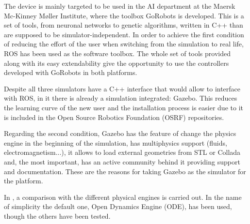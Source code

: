The device is mainly targeted to be used in the AI department at the Maersk Mc-Kinney Møller Institute, where the toolbox GoRobots is developed.
This is a set of tools, from neuronal networks to genetic algorithms, written in C++ than are supposed to be simulator-independent.
In order to achieve the first condition of reducing the effort of the user when switching from the simulation to real life, ROS \cite{ros} has been used as the software toolbox.
The whole set of tools provided along with its easy extendability give the opportunity to use the controllers developed with GoRobots in both platforms.

Despite all three simulators have a C++ interface that would allow to interface with ROS, in it there is already a simulation integrated: Gazebo.
This reduces the learning curve of the new user and the installation process is easier due to it is included in the Open Source Robotics Foundation (OSRF) repositories.

Regarding the second condition, Gazebo has the feature of change the physics engine in the beginning of the simulation, has multiphysics support (fluids, electromagnetism...), it allows to load external geometries from STL or Collada and, the most important, has an active community behind it providing support and documentation. These are the reasons for taking Gazebo as the simulator for the platform.

In \cite{physics_engine_gazebo_comparison}, a comparison with the different physical engines is carried out.
In the name of simplicity the default one, Open Dynamics Engine (ODE), has been used, though the others have been tested.

